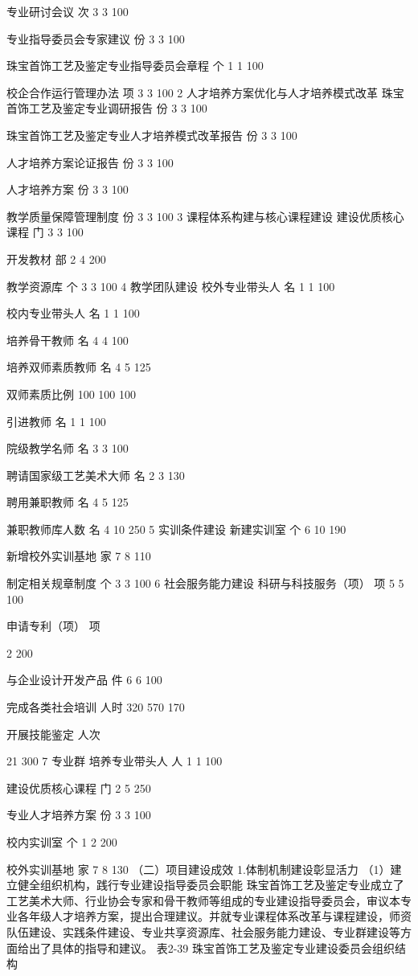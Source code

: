 专业研讨会议
次
3
3
100%


专业指导委员会专家建议
份
3
3
100%


珠宝首饰工艺及鉴定专业指导委员会章程
个
1
1
100%


校企合作运行管理办法
项
3
3
100%
2
人才培养方案优化与人才培养模式改革
珠宝首饰工艺及鉴定专业调研报告
份
3
3
100%


珠宝首饰工艺及鉴定专业人才培养模式改革报告
份
3
3
100%


人才培养方案论证报告
份
3
3
100%


人才培养方案
份
3
3
100%


教学质量保障管理制度
份
3
3
100%
3
课程体系构建与核心课程建设
建设优质核心课程
门
3
3
100%


开发教材
部
2
4
200%


教学资源库
个
3
3
100%
4
教学团队建设
校外专业带头人
名
1
1
100%


校内专业带头人
名
1
1
100%


培养骨干教师
名
4
4
100%


培养双师素质教师
名
4
5
125%


双师素质比例
%
100%
100%
100%


引进教师
名
1
1
100%


院级教学名师
名
3
3
100%


聘请国家级工艺美术大师
名
2
3
130%


聘用兼职教师
名
4
5
125%


兼职教师库人数
名
4
10
250%
5
实训条件建设
新建实训室
个
6
10
190%


新增校外实训基地
家
7
8
110%


制定相关规章制度
个
3
3
100%
6
社会服务能力建设
科研与科技服务（项）
项
5
5
100%


申请专利（项）
项

2
200%


与企业设计开发产品
件
6
6
100%


完成各类社会培训
人时
320
570
170%


开展技能鉴定
人次

21
300%
7
专业群
培养专业带头人
人
1
1
100%


建设优质核心课程
门
2
5
250%


专业人才培养方案
份
3
3
100%


校内实训室
个
1
2
200%


校外实训基地
家
7
8
130%
（二）项目建设成效
1.体制机制建设彰显活力
（1）建立健全组织机构，践行专业建设指导委员会职能
珠宝首饰工艺及鉴定专业成立了工艺美术大师、行业协会专家和骨干教师等组成的专业建设指导委员会，审议本专业各年级人才培养方案，提出合理建议。并就专业课程体系改革与课程建设，师资队伍建设、实践条件建设、专业共享资源库、社会服务能力建设、专业群建设等方面给出了具体的指导和建议。
表2-39   珠宝首饰工艺及鉴定专业建设委员会组织结构

